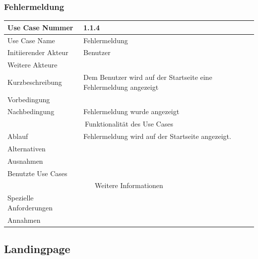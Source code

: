 \documentclass[10pt,a4paper]{article}
\begin{document}
\subsubsection{Fehlermeldung} %
	\begin{tabular}{|l|p{.5\linewidth}|}
	\hline Use Case Nummer & 1.1.4 \\ 
	\hline Use Case Name & Fehlermeldung \\ 
	\hline Initiierender Akteur & Benutzer \\
	\hline Weitere Akteure &  \\
	\hline Kurzbeschreibung & Dem Benutzer wird auf der Startseite eine Fehlermeldung angezeigt \\
	\hline Vorbedingung &  \\
	\hline Nachbedingung & Fehlermeldung wurde angezeigt \\
	\hline \multicolumn{2}{|c|}{Funktionalität des Use Cases}\\
	\hline Ablauf & Fehlermeldung wird auf der Startseite angezeigt. \\
	\hline Alternativen &  \\
	\hline Ausnahmen &  \\
	\hline Benutzte Use Cases &  \\
	\hline \multicolumn{2}{|c|}{Weitere Informationen} \\
	\hline Spezielle Anforderungen &  \\
	\hline Annahmen &  \\
	\hline
	\end{tabular}
                
\subsection{Landingpage}
\end{document}
